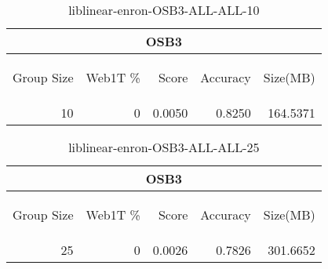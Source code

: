 \begin{center}
\begin{table}[htbp] 
 \begin{center}
\begin{tabular}{ | r | r | r | r | r |}
\hline
\multicolumn{5}{|c|}{OSB3}\\
\hline
\begin{sideways}Group Size\end{sideways} & \begin{sideways}Web1T \%\end{sideways} & \begin{sideways}Score\end{sideways} & \begin{sideways}Accuracy\end{sideways} & \begin{sideways}Size(MB)\end{sideways}\\
\hline
\multirow{0}{*}{10}
 & 0 & 0.0050 & 0.8250 & 164.5371\\ \cline{2-5}
\hline
\end{tabular}
\caption{liblinear-enron-OSB3-ALL-ALL-10}
\label{table:liblinear-enron-OSB3-ALL-ALL-10}
\end{center}
 \end{table}
\end{center}

\begin{center}
\begin{table}[htbp] 
 \begin{center}
\begin{tabular}{ | r | r | r | r | r |}
\hline
\multicolumn{5}{|c|}{OSB3}\\
\hline
\begin{sideways}Group Size\end{sideways} & \begin{sideways}Web1T \%\end{sideways} & \begin{sideways}Score\end{sideways} & \begin{sideways}Accuracy\end{sideways} & \begin{sideways}Size(MB)\end{sideways}\\
\hline
\multirow{0}{*}{25}
 & 0 & 0.0026 & 0.7826 & 301.6652\\ \cline{2-5}
\hline
\end{tabular}
\caption{liblinear-enron-OSB3-ALL-ALL-25}
\label{table:liblinear-enron-OSB3-ALL-ALL-25}
\end{center}
 \end{table}
\end{center}

